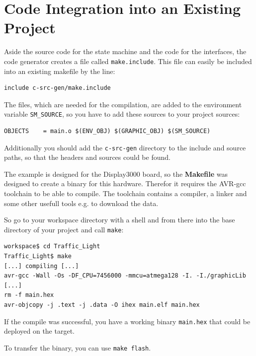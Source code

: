 \newpage

\section{Code Integration into an Existing Project}

Aside the source code for the state machine and the code for the interfaces, the
code generator creates a file called \texttt{make.include}. This file can easily
be included into an existing makefile by the line:

\begin{verbatim}
include c-src-gen/make.include
\end{verbatim}

The files, which are needed for the compilation, are added to the environment
variable \texttt{SM\_SOURCE}, so you have to add these sources to your project
sources:

\begin{verbatim}
OBJECTS    = main.o $(ENV_OBJ) $(GRAPHIC_OBJ) $(SM_SOURCE)
\end{verbatim}

Additionally you should add the \texttt{c-src-gen} directory to the include and
source paths, so that the headers and sources could be found.
 
The example is designed for the Display3000 board, so the \textbf{Makefile} was
designed to create a binary for this hardware. Therefor it requires the AVR-gcc
toolchain to be able to compile. The toolchain contains a compiler, a linker and
some other usefull tools e.g. to download the data.

So go to your workspace directory with a shell and from there into the base
directory of your project and call \texttt{make}:

\begin{verbatim}
workspace$ cd Traffic_Light
Traffic_Light$ make
[...] compiling [...]
avr-gcc -Wall -Os -DF_CPU=7456000 -mmcu=atmega128 -I. -I./graphicLib [...]
rm -f main.hex
avr-objcopy -j .text -j .data -O ihex main.elf main.hex
\end{verbatim} 

If the compile was successful, you have a working binary \texttt{main.hex} that
could be deployed on the target.

To transfer the binary, you can use \texttt{make flash}.

